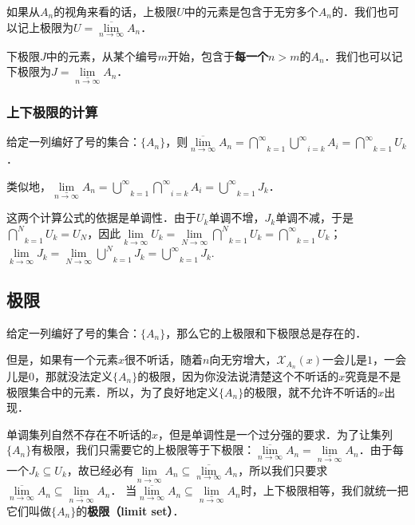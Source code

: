如果从$A_n$的视角来看的话，上极限$U$中的元素是包含于无穷多个$A_n$的．我们也可以记上极限为$U=\overline{\lim}\limits_{n\rightarrow \infty}A_n$．

下极限$J$中的元素，从某个编号$m$开始，包含于\textbf{每一个}$n>m$的$A_n$．我们也可以记下极限为$J=\underline{\lim}\limits_{n\rightarrow \infty}A_n$．

\subsubsection{上下极限的计算}
给定一列编好了号的集合：$\{A_n\}$，则$\overline{\lim}\limits_{n\rightarrow \infty}A_n=\overset{\infty}\bigcap\limits_{k=1}\overset{\infty}\bigcup\limits_{i=k}A_i=\overset{\infty}\bigcap\limits_{k=1}U_k$．

类似地，$\underline{\lim}\limits_{n\rightarrow \infty}A_n=\overset{\infty}\bigcup\limits_{k=1}\overset{\infty}\bigcap\limits_{i=k}A_i=\overset{\infty}\bigcup\limits_{k=1}J_k$．

这两个计算公式的依据是单调性．由于$U_k$单调不增，$J_k$单调不减，于是$\overset{N}\bigcap\limits_{k=1}U_k=U_N$，因此$\lim\limits_{k\rightarrow\infty}U_k=\lim\limits_{N\rightarrow\infty}\overset{N}\bigcap\limits_{k=1}U_k=\overset{\infty}\bigcap\limits_{k=1}U_k$；$\lim\limits_{k\rightarrow\infty}J_k=\lim\limits_{N\rightarrow\infty}\overset{N}\bigcup\limits_{k=1}J_k=\overset{\infty}\bigcup\limits_{k=1}J_k$.

\subsection{极限}
给定一列编好了号的集合：$\{A_n\}$，那么它的上极限和下极限总是存在的．

但是，如果有一个元素$x$很不听话，随着$n$向无穷增大，$\mathcal{X}_{A_n}(x)$一会儿是$1$，一会儿是$0$，那就没法定义$\{A_n\}$的极限，因为你没法说清楚这个不听话的$x$究竟是不是极限集合中的元素．所以，为了良好地定义$\{A_n\}$的极限，就不允许不听话的$x$出现．

单调集列自然不存在不听话的$x$，但是单调性是一个过分强的要求．为了让集列$\{A_n\}$有极限，我们只需要它的上极限等于下极限：$\overline{\lim}\limits_{n\rightarrow \infty}A_n=\underline{\lim}\limits_{n\rightarrow \infty}A_n$．由于每一个$J_k\subseteq U_k$，故已经必有$\underline{\lim}\limits_{n\rightarrow \infty}A_n\subseteq\overline{\lim}\limits_{n\rightarrow \infty}A_n$，所以我们只要求$\overline{\lim}\limits_{n\rightarrow \infty}A_n\subseteq\underline{\lim}\limits_{n\rightarrow \infty}A_n$．
当$\overline{\lim}\limits_{n\rightarrow \infty}A_n\subseteq\underline{\lim}\limits_{n\rightarrow \infty}A_n$时，上下极限相等，我们就统一把它们叫做$\{A_n\}$的\textbf{极限（limit set）}．
